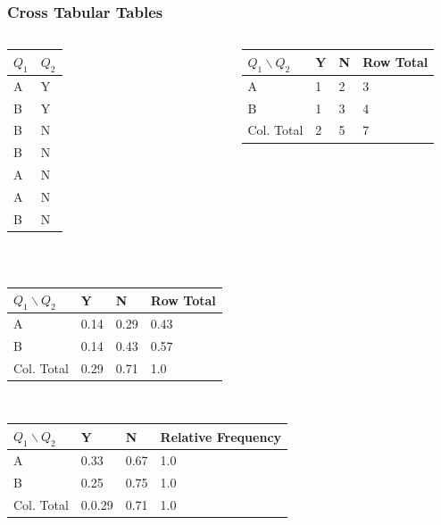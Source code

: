 \begin{frame}
  \frametitle{Cross Tabular Tables}


  \begin{columns}

    \begin{tabular}{ll}
      $Q_{1}$ & $Q_{2}$ \\ \hline
      A & Y \\
      B & Y \\
      B & N \\
      B & N \\
      A & N \\
      A & N \\
      B & N
    \end{tabular}


    {
      \begin{tabular}{l|l|l|l}
        $Q_1 \backslash Q_2$ & Y & N & Row Total \\ \hline
        A & 1 & 2 & 3 \\ \hline
        B & 1 & 3 & 4 \\ \hline
        Col. Total & 2 & 5 & 7
      \end{tabular}
    }

  \end{columns}

    \vfill

    {
      {\color{red}{Relative frequency}} \\
      \begin{tabular}{l|l|l|l}
        $Q_1 \backslash Q_2$ & Y & N & Row Total \\ \hline
        A & 0.14 & 0.29 & 0.43 \\ \hline
        B & 0.14 & 0.43 & 0.57 \\ \hline
        Col. Total & 0.29 & 0.71 & 1.0
      \end{tabular}
    }

    \vfill

    {
      {\color{red}{Marginal Distribution by Rows}} \\
      \begin{tabular}{l|l|l|l}
        $Q_1 \backslash Q_2$ & Y & N & Relative Frequency\\ \hline
        A & 0.33 & 0.67 & 1.0 \\ \hline
        B & 0.25 & 0.75 & 1.0 \\ \hline
        Col. Total & 0.0.29 & 0.71 & 1.0
      \end{tabular}
    }


\end{frame}
